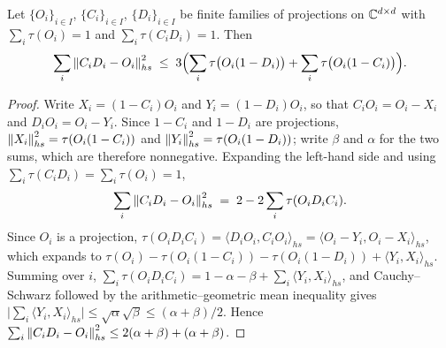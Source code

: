 \begin{lemma}
\label{lem:hs-closeness}
\leanok
Let $\{O_i\}_{i \in I}$, $\{C_i\}_{i \in I}$, $\{D_i\}_{i \in I}$ be finite families of
projections on $\mathbb{C}^{d \times d}$ with $\sum_i \tau(O_i) = 1$ and $\sum_i \tau(C_i D_i) = 1$.
Then
\begin{equation*}
  \sum_i \left\| {C_i D_i - O_i} \right\|_{hs}^2 \;\leq\; 3 \Bigl( \sum_i \tau\bigl(O_i (1 - D_i)\bigr)
    + \sum_i \tau\bigl(O_i (1 - C_i)\bigr) \Bigr).
\end{equation*}
\end{lemma}
\begin{proof}
\leanok
Write $X_i = (1 - C_i) O_i$ and $Y_i = (1 - D_i) O_i$, so that $C_i O_i = O_i - X_i$ and
$D_i O_i = O_i - Y_i$. Since $1 - C_i$ and $1 - D_i$ are projections,
$\left\| {X_i} \right\|_{hs}^2 = \tau(O_i (1 - C_i))$ and $\left\| {Y_i} \right\|_{hs}^2 = \tau(O_i (1 - D_i))$; write
$\beta$ and $\alpha$ for the two sums, which are therefore nonnegative. Expanding the
left-hand side and using $\sum_i \tau(C_i D_i) = \sum_i \tau(O_i) = 1$,
\begin{equation*}
  \sum_i \left\| {C_i D_i - O_i} \right\|_{hs}^2 \;=\; 2 - 2 \sum_i \tau(O_i D_i C_i).
\end{equation*}
Since $O_i$ is a projection, $\tau(O_i D_i C_i) = \langle D_i O_i, C_i O_i \rangle_{hs} =
\langle O_i - Y_i, O_i - X_i \rangle_{hs}$, which expands to $\tau(O_i) -
\tau(O_i(1 - C_i)) - \tau(O_i(1 - D_i)) + \langle Y_i, X_i \rangle_{hs}$. Summing over $i$,
$\sum_i \tau(O_i D_i C_i) = 1 - \alpha - \beta + \sum_i \langle Y_i, X_i \rangle_{hs}$, and
Cauchy--Schwarz followed by the arithmetic--geometric mean inequality gives
$\bigl| \sum_i \langle Y_i, X_i \rangle_{hs} \bigr| \leq \sqrt{\alpha}\sqrt{\beta} \leq
(\alpha + \beta)/2$. Hence $\sum_i \left\| {C_i D_i - O_i} \right\|_{hs}^2 \leq 2(\alpha + \beta) +
(\alpha + \beta)$.
\end{proof}

